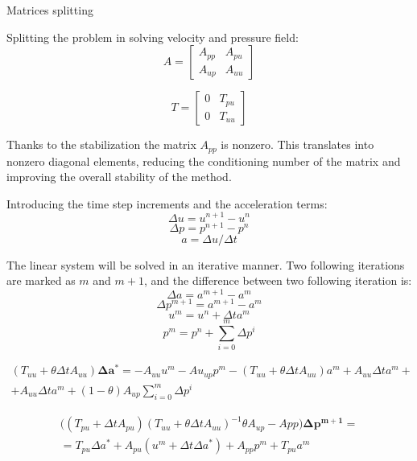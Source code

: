 \begin{frame}{Matrices splitting}

  Splitting the problem in solving velocity and pressure field:
\begin{equation}
  A = \begin{bmatrix}
A_{pp} & A_{pu}\\
A_{up} & A_{uu}
\end{bmatrix}
\end{equation}

\begin{equation}
  T = \begin{bmatrix}
  0 & T_{pu}\\
  0 & T_{uu}
\end{bmatrix}
\end{equation}


Thanks to the stabilization the matrix $A_{pp}$ is nonzero. This translates into nonzero diagonal elements, reducing the conditioning number of the matrix and improving the overall stability of the method.

\end{frame}


\begin{frame}
Introducing the time step increments and the acceleration terms:
$$\Delta u = u^{n+1}-u^{n}$$
$$\Delta p = p^{n+1}-p^{n}$$
$$a = \Delta u / \Delta t$$

The linear system will be solved in an iterative manner. Two following iterations are marked as $m$ and $m+1$, and the difference between two following iteration is:
$$\Delta a = a^{m+1}-a^m$$
$$\Delta p^{m+1} = a^{m+1}-a^m$$
$$u^m=u^n+\Delta t a^m$$
$$p^m = p^n + \sum_{i=0}^m \Delta p^i$$
\end{frame}

\begin{frame}
  \begin{equation}
    \begin{split}
    (T_{uu}+\theta \Delta t A_{uu})\bm{\Delta a^*} = -A_{uu}u^m- Au_{up}p^m - (T_{uu}+\theta\Delta t A_{uu})a^m+A_{uu}\Delta t a^m +\\+ A_{uu}\Delta t a^m + (1-\theta)A_{up}\sum_{i=0}^m \Delta p^i  
  \end{split}
  \label{equseg:mom1}
\end{equation}

\begin{equation}
  \begin{split}
  \bigg( (T_{pu}+\Delta t A_{pu})(T_{uu}+\theta\Delta t A_{uu})^{-1} \theta A_{up} - App \bigg ) \bm{\Delta p^{m+1}} = \\= T_{pu}\Delta a^* + A_{pu}(u^m+\Delta t\Delta a^*)+A_{pp}p^m+T_{pu}a^m
\end{split}
\label{equseg:cont1}
\end{equation}
\end{frame}

